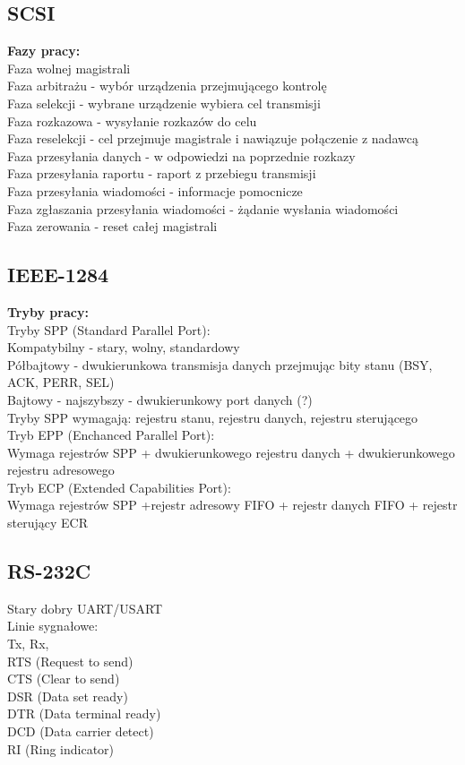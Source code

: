 \documentclass[a4paper]{article}
\begin{document}
\subsection{SCSI}
\textbf{Fazy pracy: }\\
Faza wolnej magistrali\\
Faza arbitrażu - wybór urządzenia przejmującego kontrolę\\
Faza selekcji - wybrane urządzenie wybiera cel transmisji\\
Faza rozkazowa - wysyłanie rozkazów do celu\\
Faza reselekcji - cel przejmuje magistrale i nawiązuje połączenie z nadawcą\\
Faza przesyłania danych - w odpowiedzi na poprzednie rozkazy\\
Faza przesyłania raportu - raport z przebiegu transmisji\\
Faza przesyłania wiadomości - informacje pomocnicze\\
Faza zgłaszania przesyłania wiadomości - żądanie wysłania wiadomości\\
Faza zerowania - reset całej magistrali

\subsection{IEEE-1284}
\textbf{Tryby pracy: }\\
Tryby SPP (Standard Parallel Port): \\
Kompatybilny - stary, wolny, standardowy\\
Półbajtowy - dwukierunkowa transmisja danych przejmując bity stanu (BSY, ACK, PERR, SEL)\\
Bajtowy - najszybszy - dwukierunkowy port danych (?)\\
Tryby SPP wymagają: rejestru stanu, rejestru danych, rejestru sterującego\\
Tryb EPP (Enchanced Parallel Port): \\
Wymaga rejestrów SPP + dwukierunkowego rejestru danych + dwukierunkowego rejestru adresowego\\
Tryb ECP (Extended Capabilities Port): \\
Wymaga rejestrów SPP +rejestr adresowy FIFO + rejestr danych FIFO + rejestr sterujący ECR \\
\subsection{RS-232C}
Stary dobry UART/USART\\
Linie sygnałowe: \\
Tx, Rx,\\
RTS (Request to send)\\
CTS (Clear to send)\\
DSR (Data set ready)\\
DTR (Data terminal ready)\\
DCD (Data carrier detect)\\
RI (Ring indicator)\\
\end{document}
